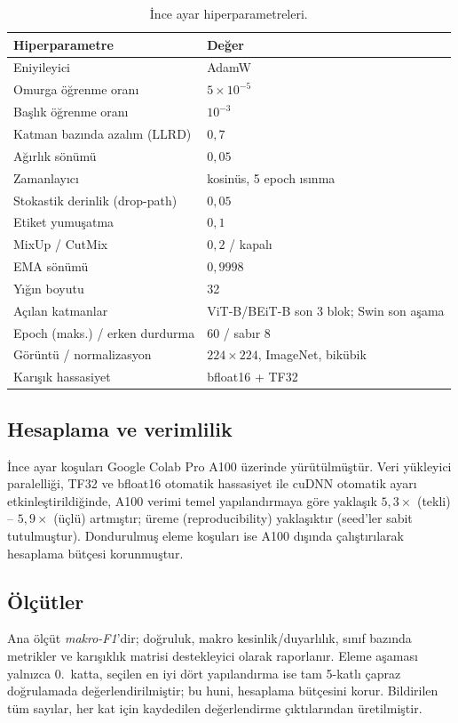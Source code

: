 \begin{table}[H]
  \centering
  \caption{İnce ayar hiperparametreleri.}
  \label{tab:hparams}
  \begin{tabular}{ll}
    \toprule
    Hiperparametre & Değer \\
    \midrule
    Eniyileyici & AdamW \\
    Omurga öğrenme oranı & $5\times10^{-5}$ \\
    Başlık öğrenme oranı & $10^{-3}$ \\
    Katman bazında azalım (LLRD) & $0{,}7$ \\
    Ağırlık sönümü & $0{,}05$ \\
    Zamanlayıcı & kosinüs, 5 epoch ısınma \\
    Stokastik derinlik (drop-path) & $0{,}05$ \\
    Etiket yumuşatma & $0{,}1$ \\
    MixUp / CutMix & $0{,}2$ / kapalı \\
    EMA sönümü & $0{,}9998$ \\
    Yığın boyutu & 32 \\
    Açılan katmanlar & ViT-B/BEiT-B son 3 blok; Swin son aşama \\
    Epoch (maks.) / erken durdurma & 60 / sabır 8 \\
    Görüntü / normalizasyon & $224{\times}224$, ImageNet, bikübik \\
    Karışık hassasiyet & bfloat16 + TF32 \\
    \bottomrule
  \end{tabular}
\end{table}

\subsection{Hesaplama ve verimlilik}
İnce ayar koşuları Google Colab Pro A100 üzerinde yürütülmüştür. Veri yükleyici
paralelliği, TF32 ve bfloat16 otomatik hassasiyet ile cuDNN otomatik ayarı
etkinleştirildiğinde, A100 verimi temel yapılandırmaya göre yaklaşık
$5{,}3\times$ (tekli) -- $5{,}9\times$ (üçlü) artmıştır; üreme
(reproducibility) yaklaşıktır (seed'ler sabit tutulmuştur). Dondurulmuş eleme
koşuları ise A100 dışında çalıştırılarak hesaplama bütçesi korunmuştur.

\subsection{Ölçütler}
Ana ölçüt \emph{makro-F1}'dir; doğruluk, makro kesinlik/duyarlılık, sınıf bazında
metrikler ve karışıklık matrisi destekleyici olarak raporlanır. Eleme aşaması
yalnızca 0.~katta, seçilen en iyi dört yapılandırma ise tam 5-katlı çapraz
doğrulamada değerlendirilmiştir; bu huni, hesaplama bütçesini korur. Bildirilen
tüm sayılar, her kat için kaydedilen değerlendirme çıktılarından üretilmiştir.
